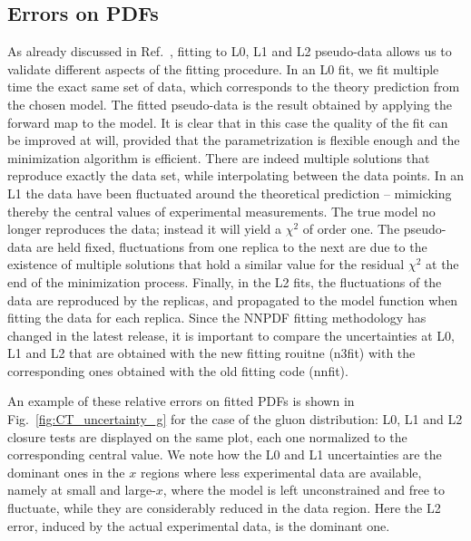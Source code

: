 
\subsection{Errors on PDFs}

As already discussed in Ref.~\cite{nnpdf30}, fitting to L0, L1 and L2
pseudo-data allows us to validate different aspects of the fitting procedure. In
an L0 fit, we fit multiple time the exact same set of data, which corresponds to
the theory prediction from the chosen model. The fitted pseudo-data is the
result obtained by applying the forward map to the model. It is clear that in
this case the quality of the fit can be improved at will, provided that the
parametrization is flexible enough and the minimization algorithm is efficient.
There are indeed multiple solutions that reproduce exactly the data set, while
interpolating between the data points. In an L1 the data have been fluctuated
around the theoretical prediction -- mimicking thereby the central values of
experimental measurements. The true model no longer reproduces the data; instead
it will yield a $\chi^2$ of order one. The pseudo-data are held fixed,
fluctuations from one replica to the next are due to the existence of multiple
solutions that hold a similar value for the residual $\chi^2$ at the end of the
minimization process. Finally, in the L2 fits, the fluctuations of the data are
reproduced by the replicas, and propagated to the model function when fitting
the data for each replica. Since the NNPDF fitting methodology has changed in
the latest release, it is important to compare the uncertainties at L0, L1 and
L2 that are obtained with the new fitting rouitne (n3fit) with the corresponding
ones obtained with the old fitting code (nnfit). 

An example of these relative errors on fitted PDFs is shown in Fig.~\ref{fig:CT_uncertainty_g}
for the case of the gluon distribution: L0, L1 and L2 closure tests are displayed on the same plot, each one
normalized to the corresponding central value. 
We note how the L0 and L1 uncertainties are the dominant ones in the $x$ regions where less experimental data are available,
namely at small and large-$x$, where the model is left unconstrained and free to fluctuate, while they are considerably
reduced in the data region. Here the L2 error, induced by the actual experimental data, is the dominant one.

